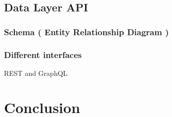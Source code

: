 \subsection{Data Layer API}
\subsubsection{Schema ( Entity Relationship Diagram )}
\newpage
\subsubsection{Different interfaces}
REST and GraphQL
\newpage
\setcounter{secnumdepth}{0} %
\section{Conclusion}
\lipsum[2]
